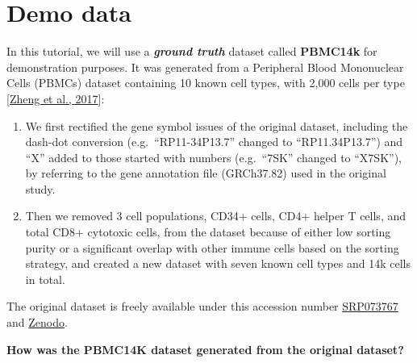 \documentclass[
  12pt,
]{book}
\providecommand{\tightlist}{%
  \setlength{\itemsep}{0pt}\setlength{\parskip}{0pt}}
\begin{document}
\section{Demo data}\label{demo-data}

In this tutorial, we will use a \textbf{\emph{ground truth}} dataset called \textbf{PBMC14k} for demonstration purposes. It was generated from a Peripheral Blood Mononuclear Cells (PBMCs) dataset containing 10 known cell types, with 2,000 cells per type {[}\href{./data-reference.md\#\%5BZheng\%20et\%20al.,\%202017\%5D}{Zheng et al., 2017}{]}:

\begin{enumerate}
\def\labelenumi{\arabic{enumi}.}
\tightlist
\item
  We first rectified the gene symbol issues of the original dataset, including the dash-dot conversion (e.g.~``RP11-34P13.7'' changed to ``RP11.34P13.7'') and ``X'' added to those started with numbers (e.g.~``7SK'' changed to ``X7SK''), by referring to the gene annotation file (GRCh37.82) used in the original study.
\item
  Then we removed 3 cell populations, CD34+ cells, CD4+ helper T cells, and total CD8+ cytotoxic cells, from the dataset because of either low sorting purity or a significant overlap with other immune cells based on the sorting strategy, and created a new dataset with seven known cell types and 14k cells in total.
\end{enumerate}

The original dataset is freely available under this accession number \href{https://www.ncbi.nlm.nih.gov/sra?term=SRP073767}{SRP073767} and \href{https://zenodo.org/record/3357167\#.YhQNF2RKj6V}{Zenodo}.

\textbf{How was the PBMC14K dataset generated from the original dataset?}
\end{document}
